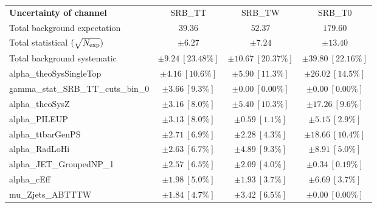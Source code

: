 
\begin{table}
\begin{center}
\setlength{\tabcolsep}{0.0pc}
\begin{tabular*}{\textwidth}{@{\extracolsep{\fill}}lccc}
\noalign{\smallskip}\hline\noalign{\smallskip}
{\bf Uncertainty of channel}                                    & SRB\_TT            & SRB\_TW            & SRB\_T0            \\
\noalign{\smallskip}\hline\noalign{\smallskip}
Total background expectation             &  $39.36$        &  $52.37$        &  $179.60$       \\
\noalign{\smallskip}\hline\noalign{\smallskip}
Total statistical $(\sqrt{N_{\rm exp}})$              & $\pm 6.27$        & $\pm 7.24$        & $\pm 13.40$       \\
Total background systematic               & $\pm 9.24\ [23.48\%] $        & $\pm 10.67\ [20.37\%] $        & $\pm 39.80\ [22.16\%] $             \\
\noalign{\smallskip}\hline\noalign{\smallskip}
\noalign{\smallskip}\hline\noalign{\smallskip}
alpha\_theoSysSingleTop         & $\pm 4.16\ [10.6\%] $          & $\pm 5.90\ [11.3\%] $          & $\pm 26.02\ [14.5\%] $       \\
gamma\_stat\_SRB\_TT\_cuts\_bin\_0         & $\pm 3.66\ [9.3\%] $          & $\pm 0.00\ [0.00\%] $          & $\pm 0.00\ [0.00\%] $       \\
alpha\_theoSysZ         & $\pm 3.16\ [8.0\%] $          & $\pm 5.40\ [10.3\%] $          & $\pm 17.26\ [9.6\%] $       \\
alpha\_PILEUP         & $\pm 3.13\ [8.0\%] $          & $\pm 0.59\ [1.1\%] $          & $\pm 5.15\ [2.9\%] $       \\
alpha\_ttbarGenPS         & $\pm 2.71\ [6.9\%] $          & $\pm 2.28\ [4.3\%] $          & $\pm 18.66\ [10.4\%] $       \\
alpha\_RadLoHi         & $\pm 2.63\ [6.7\%] $          & $\pm 4.89\ [9.3\%] $          & $\pm 8.91\ [5.0\%] $       \\
alpha\_JET\_GroupedNP\_1         & $\pm 2.57\ [6.5\%] $          & $\pm 2.09\ [4.0\%] $          & $\pm 0.34\ [0.19\%] $       \\
alpha\_cEff         & $\pm 1.98\ [5.0\%] $          & $\pm 1.93\ [3.7\%] $          & $\pm 6.69\ [3.7\%] $       \\
mu\_Zjets\_ABTTTW         & $\pm 1.84\ [4.7\%] $          & $\pm 3.42\ [6.5\%] $          & $\pm 0.00\ [0.00\%] $       \\

\end{tabular*}
\end{center}
\end{table}
